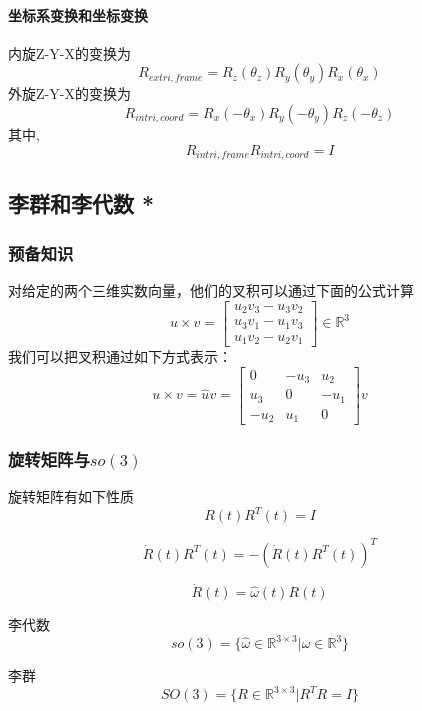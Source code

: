 \documentclass{ctexart}
\begin{document}
	\paragraph{坐标系变换和坐标变换}
	内旋Z-Y-X的变换为
	\begin{equation}
	R_{extri,frame}=R_z(\theta_z) R_y(\theta_y) R_x(\theta_x)
	\end{equation}
	外旋Z-Y-X的变换为
	\begin{equation}
	R_{intri,coord}=R_x(-\theta_x) R_y(-\theta_y) R_z(-\theta_z)
	\end{equation}
	其中,
	\begin{equation}
	R_{intri,frame} R_{intri,coord} = I
	\end{equation}
	
	
	
	\subsection{李群和李代数 *}
	\subsubsection{预备知识}
	对给定的两个三维实数向量，他们的叉积可以通过下面的公式计算
	\begin{equation}
	u \times v =
	\begin{bmatrix}
	u_2 v_3 - u_3 v_2 \\
	u_3 v_1 - u_1 v_3 \\
	u_1 v_2 - u_2 v_1
	\end{bmatrix}
	\in \mathbb{R}^3
	\end{equation}
	我们可以把叉积通过如下方式表示：
	\begin{equation}
	u \times v =
	\hat{u} v =
	\begin{bmatrix}
	0 & -u_3 & u_2 \\
	u_3 & 0 & -u_1 \\
	-u_2 & u_1 & 0
	\end{bmatrix}
	v
	\end{equation}
	\subsubsection{旋转矩阵与$so(3)$}
	旋转矩阵有如下性质
	\begin{equation}
	R(t) R^T(t) = I
	\end{equation}
	
	\begin{equation}
	\dot{R}(t) R^T(t) = -(\dot{R}(t) R^T(t))^T
	\end{equation}
	
	\begin{equation}
	\dot{R}(t) = \hat{\omega}(t) R(t)
	\end{equation}
	
	李代数
	\begin{equation}
	so(3) = \{ \hat{\omega} \in \mathbb{R}^{3\times 3} | \omega \in \mathbb{R}^3 \}
	\end{equation}
	
	李群
	\begin{equation}
	SO(3) = \{ R \in \mathbb{R}^{3\times 3} | R^T R = I \}
	\end{equation}
	
	
	
	
\end{document}

